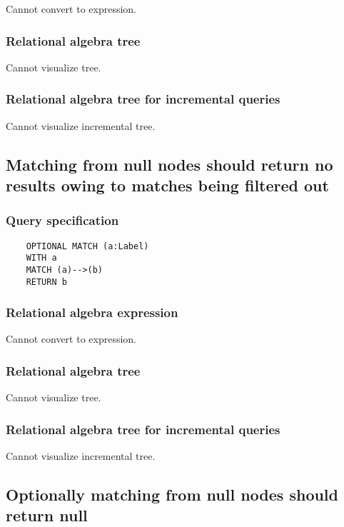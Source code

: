 	Cannot convert to expression.

	\subsubsection*{Relational algebra tree}

	Cannot visualize tree.

	\subsubsection*{Relational algebra tree for incremental queries}

	Cannot visualize incremental tree.
	\subsection{Matching from null nodes should return no results owing to matches being filtered out}

	\subsubsection*{Query specification}

	\begin{lstlisting}
	OPTIONAL MATCH (a:Label)
	WITH a
	MATCH (a)-->(b)
	RETURN b
	\end{lstlisting}


	\subsubsection*{Relational algebra expression}

	Cannot convert to expression.

	\subsubsection*{Relational algebra tree}

	Cannot visualize tree.

	\subsubsection*{Relational algebra tree for incremental queries}

	Cannot visualize incremental tree.
	\subsection{Optionally matching from null nodes should return null}

